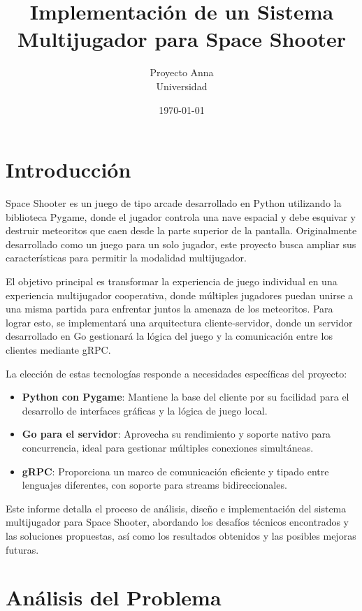 \documentclass[12pt,letterpaper]{article}
\title{\textbf{Implementación de un Sistema Multijugador para Space Shooter}}
\author{Proyecto Anna \\ Universidad}
\date{\today}
\begin{document}
\maketitle

\tableofcontents
\newpage

\section{Introducción}

Space Shooter es un juego de tipo arcade desarrollado en Python utilizando la biblioteca Pygame, donde el jugador controla una nave espacial y debe esquivar y destruir meteoritos que caen desde la parte superior de la pantalla. Originalmente desarrollado como un juego para un solo jugador, este proyecto busca ampliar sus características para permitir la modalidad multijugador.

El objetivo principal es transformar la experiencia de juego individual en una experiencia multijugador cooperativa, donde múltiples jugadores puedan unirse a una misma partida para enfrentar juntos la amenaza de los meteoritos. Para lograr esto, se implementará una arquitectura cliente-servidor, donde un servidor desarrollado en Go gestionará la lógica del juego y la comunicación entre los clientes mediante gRPC.

La elección de estas tecnologías responde a necesidades específicas del proyecto:

\begin{itemize}
    \item \textbf{Python con Pygame}: Mantiene la base del cliente por su facilidad para el desarrollo de interfaces gráficas y la lógica de juego local.
    \item \textbf{Go para el servidor}: Aprovecha su rendimiento y soporte nativo para concurrencia, ideal para gestionar múltiples conexiones simultáneas.
    \item \textbf{gRPC}: Proporciona un marco de comunicación eficiente y tipado entre lenguajes diferentes, con soporte para streams bidireccionales.
\end{itemize}

Este informe detalla el proceso de análisis, diseño e implementación del sistema multijugador para Space Shooter, abordando los desafíos técnicos encontrados y las soluciones propuestas, así como los resultados obtenidos y las posibles mejoras futuras.

\section{Análisis del Problema}
\end{document}
